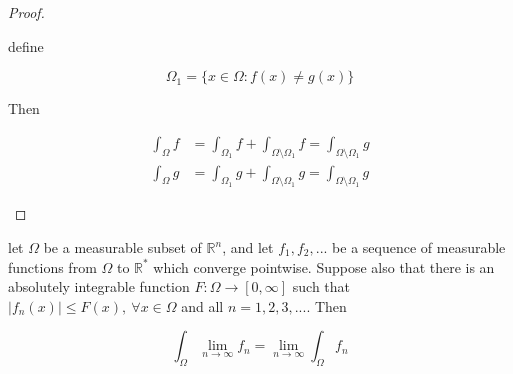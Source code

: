 \begin{proof}
\begin{enumerate}
        define 

        \[
            \Omega_1 = \{ x \in \Omega: f(x) \ne g(x)\}
        \]

        Then

        \begin{align*}
            \int_{\Omega}f &= \int_{\Omega_1}f + \int_{\Omega \setminus \Omega_1}f = \int_{\Omega \setminus \Omega_1}g \\
            \int_{\Omega}g &= \int_{\Omega_1}g + \int_{\Omega \setminus \Omega_1}g = \int_{\Omega \setminus \Omega_1}g
        \end{align*}
    \end{enumerate}
\end{proof}

\begin{thm}
    \label{thm:lebesgue-DCT-744c7182-13fa-4e6c-910a-a68f67181b29}
    let $\Omega$ be a measurable subset of $\mathbb{R}^n$, and let $f_1,f_2,...$ be a sequence of
    measurable functions from $\Omega$ to $\mathbb{R}^*$ which converge pointwise. Suppose 
    also that there is an absolutely integrable function $F: \Omega \to [0, \infty]$ such that
    $|f_n(x)| \le F(x),\: \forall x \in \Omega$ and all $n=1,2,3,...$. Then

    \[
        \int_{\Omega}\lim_{n \to \infty} f_n = \lim_{n \to \infty} \int_{\Omega} f_n
    \]

\end{thm}

